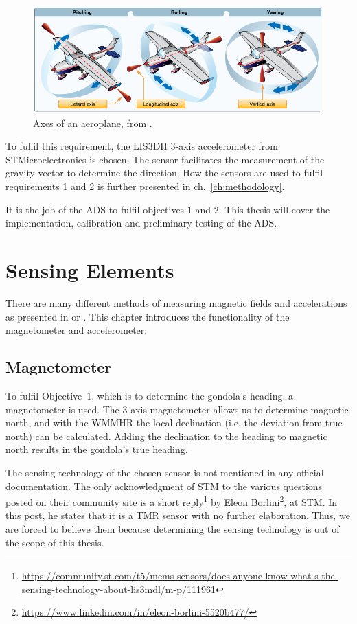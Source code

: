 \begin{figure}[H]
    \centering
    \includegraphics[width=0.75\linewidth]{images/01_background/axes_of_an_airplane.png}
    \caption[Axes of an aeroplane]{Axes of an aeroplane, from \parencite{pilot-handbook}.}
    \label{fig:attitude}
\end{figure}


To fulfil this requirement, the LIS3DH 3-axis accelerometer from STMicroelectronics is chosen. The sensor facilitates the measurement of the gravity vector to determine the  direction. How the sensors are used to fulfil requirements 1 and 2 is further presented in ch.~\ref{ch:methodology}.

It is the job of the \ac{ADS} to fulfil objectives 1 and 2. This thesis will cover the implementation, calibration and preliminary testing of the \ac{ADS}.

\section{Sensing Elements \label{sec:bg:sensing_elements}}
There are many different methods of measuring magnetic fields and accelerations as presented in \parencite{space-based-magnetometers-review} or \parencite{quantum_accelerometers}. This chapter introduces the functionality of the magnetometer and accelerometer.

\subsection{Magnetometer \label{sec:bg:magnetometers}}
To fulfil Objective~1, which is to determine the gondola's heading, a magnetometer is used. The 3-axis magnetometer allows us to determine magnetic north, and with the \ac{WMMHR} the local declination (i.e. the deviation from true north) can be calculated. Adding the declination to the heading to magnetic north results in the gondola's true heading. 

The sensing technology of the chosen sensor is not mentioned in any official documentation. The only acknowledgment of \ac{STM} to the various questions posted on their community site is a short reply\footnote{\url{https://community.st.com/t5/mems-sensors/does-anyone-know-what-s-the-sensing-technology-about-lis3mdl/m-p/111961}} by Eleon Borlini\footnote{\url{https://www.linkedin.com/in/eleon-borlini-5520b477/}},  at \ac{STM}. In this post, he states that it is a \ac{TMR} sensor with no further elaboration. Thus, we are forced to believe them because determining the sensing technology is out of the scope of this thesis.

